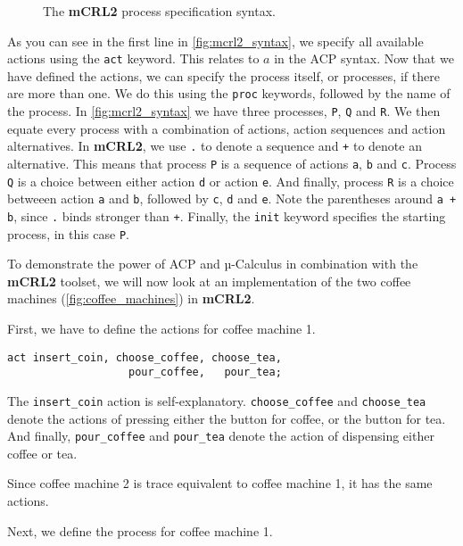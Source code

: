 \documentclass{clseminar}
\begin{document}
  \begin{figure}[!ht]
    
    \caption{The \textbf{mCRL2} process specification syntax.}
    \label{fig:mcrl2_syntax}
  \end{figure}

  As you can see in the first line in \autoref{fig:mcrl2_syntax}, we specify all available actions using the \texttt{act} keyword. This relates to $a$ in the ACP syntax. Now that we have defined the actions, we can specify the process itself, or processes, if there are more than one. We do this using the \texttt{proc} keywords, followed by the name of the process. In \autoref{fig:mcrl2_syntax} we have three processes, \texttt{P}, \texttt{Q} and \texttt{R}. We then equate every process with a combination of actions, action sequences and action alternatives. In \textbf{mCRL2}, we use \texttt{.} to denote a sequence and \texttt{+} to denote an alternative. This means that process \texttt{P} is a sequence of actions \texttt{a}, \texttt{b} and \texttt{c}. Process \texttt{Q} is a choice between either action \texttt{d} or action \texttt{e}. And finally, process \texttt{R} is a choice betweeen action \texttt{a} and \texttt{b}, followed by \texttt{c}, \texttt{d} and \texttt{e}. Note the parentheses around \texttt{a + b}, since \texttt{.} binds stronger than \texttt{+}. Finally, the \texttt{init} keyword specifies the starting process, in this case \texttt{P}.

  To demonstrate the power of ACP and µ-Calculus in combination with the \textbf{mCRL2} toolset, we will now look at an implementation of the two coffee machines (\autoref{fig:coffee_machines}) in \textbf{mCRL2}.

  First, we have to define the actions for coffee machine 1.

  \begin{lstlisting}[language=mCRL2]
act insert_coin, choose_coffee, choose_tea,
                   pour_coffee,   pour_tea;
  \end{lstlisting}

  The \texttt{insert\_coin} action is self-explanatory. \texttt{choose\_coffee} and \texttt{choose\_tea} denote the actions of pressing either the button for coffee, or the button for tea. And finally, \texttt{pour\_coffee} and \texttt{pour\_tea} denote the action of dispensing either coffee or tea.

  Since coffee machine 2 is trace equivalent to coffee machine 1, it has the same actions.

  Next, we define the process for coffee machine 1.
\end{document}
